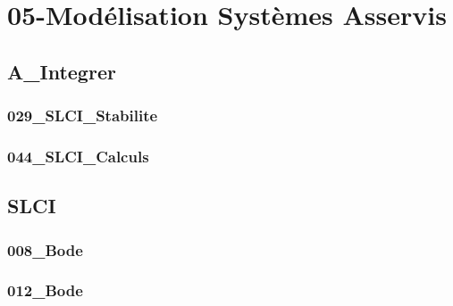 \clearpage
\chapter{05-Modélisation Systèmes Asservis}

\section{A\_Integrer}

\subsection{029\_SLCI\_Stabilite}
\graphicspath{{../05-Modélisation Systèmes Asservis/TD/A_Integrer/DDS_02/029_SLCI_Stabilite/images/}{../05-Modélisation Systèmes Asservis/TD/A_Integrer/DDS_02/029_SLCI_Stabilite/}{../Style/png/}}


\subsection{044\_SLCI\_Calculs}
\graphicspath{{../05-Modélisation Systèmes Asservis/TD/A_Integrer/DDS_03/044_SLCI_Calculs/images/}{../05-Modélisation Systèmes Asservis/TD/A_Integrer/DDS_03/044_SLCI_Calculs/}{../Style/png/}}


\section{SLCI}

\subsection{008\_Bode}
\graphicspath{{../05-Modélisation Systèmes Asservis/TD/SLCI/Bode/008_Bode/images/}{../05-Modélisation Systèmes Asservis/TD/SLCI/Bode/008_Bode/}{../Style/png/}}


\subsection{012\_Bode}
\graphicspath{{../05-Modélisation Systèmes Asservis/TD/SLCI/Bode/012_Bode/images/}{../05-Modélisation Systèmes Asservis/TD/SLCI/Bode/012_Bode/}{../Style/png/}}


